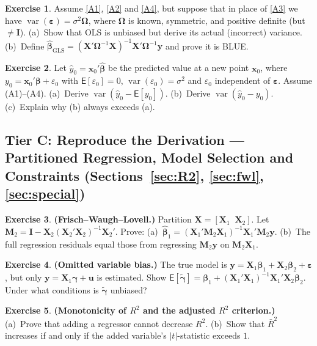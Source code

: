 \documentclass[14pt]{extarticle}
\theoremstyle{plain}
\theoremstyle{definition}
\newtheorem{exercise}{Exercise}
\newcommand{\extier}{}
\newcommand{\exercisetier}[1]{\renewcommand{\extier}{#1}\setcounter{exercise}{0}}
\theoremstyle{remark}
\newcommand\expc{\mathsf{E}}
\DeclareMathOperator\var{var}
\newcommand{\bX}{\mathbf{X}}
\newcommand{\by}{\mathbf{y}}
\newcommand{\bx}{\mathbf{x}}
\def\bb{\boldsymbol{\beta}}
\newcommand{\be}{\boldsymbol{\varepsilon}}
\newcommand{\bI}{\mathbf{I}}
\newcommand{\bM}{\mathbf{M}}
\begin{document}
\begin{exercise}\label{ex:B5}
Assume \ref{A1}, \ref{A2} and \ref{A4}, but suppose that in place of \ref{A3} we have $\var(\be) = \sigma^2\boldsymbol\Omega$, where $\boldsymbol\Omega$ is known, symmetric, and positive definite (but $\neq \bI$). (a)~Show that OLS is unbiased but derive its actual (incorrect) variance. (b)~Define $\hat{\bb}_{\mathrm{GLS}} = (\bX'\boldsymbol\Omega^{-1}\bX)^{-1}\bX'\boldsymbol\Omega^{-1}\by$ and prove it is BLUE.
\end{exercise}

\begin{exercise}\label{ex:B6}
Let $\hat{y}_0 = \bx_0'\hat{\bb}$ be the predicted value at a new point $\bx_0$, where $y_0 = \bx_0'\bb + \varepsilon_0$ with $\expc[\varepsilon_0] = 0$, $\var(\varepsilon_0) = \sigma^2$ and $\varepsilon_0$ independent of $\be$. Assume (A1)--(A4). (a)~Derive $\var(\hat{y}_0 - \expc[y_0])$. (b)~Derive $\var(\hat{y}_0 - y_0)$. (c)~Explain why (b) always exceeds (a).
\end{exercise}

\exercisetier{C}
\subsection*{Tier C: Reproduce the Derivation --- Partitioned Regression, Model Selection and Constraints (Sections~\ref{sec:R2}, \ref{sec:fwl}, \ref{sec:special})}

\begin{exercise}\label{ex:C1}
\textbf{(Frisch--Waugh--Lovell.)} Partition $\bX = [\bX_1 \;\; \bX_2]$. Let $\bM_2 = \bI - \bX_2(\bX_2'\bX_2)^{-1}\bX_2'$. Prove: (a)~$\hat{\bb}_1 = (\bX_1'\bM_2\bX_1)^{-1}\bX_1'\bM_2\by$. (b)~The full regression residuals equal those from regressing $\bM_2\by$ on $\bM_2\bX_1$.
\end{exercise}

\begin{exercise}\label{ex:C2}
\textbf{(Omitted variable bias.)} The true model is $\by = \bX_1\bb_1 + \bX_2\bb_2 + \be$, but only $\by = \bX_1\boldsymbol\gamma + \mathbf{u}$ is estimated. Show $\expc[\tilde{\boldsymbol\gamma}] = \bb_1 + (\bX_1'\bX_1)^{-1}\bX_1'\bX_2\bb_2$. Under what conditions is $\tilde{\boldsymbol\gamma}$ unbiased?
\end{exercise}

\begin{exercise}\label{ex:C3}
\textbf{(Monotonicity of $R^2$ and the adjusted $R^2$ criterion.)} (a)~Prove that adding a regressor cannot decrease $R^2$. (b)~Show that $\bar{R}^2$ increases if and only if the added variable's $|t|$-statistic exceeds $1$.
\end{exercise}
\end{document}
